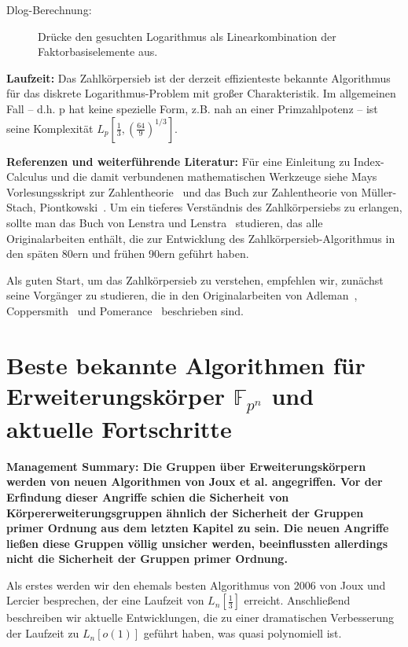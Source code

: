 \begin{refsegment}
\begin{description}
\item[Dlog-Berechnung:] Drücke den gesuchten Logarithmus als Linearkombination der Faktorbasiselemente aus.
\end{description}

\noindent \textbf{Laufzeit:}
Das Zahlkörpersieb ist der derzeit effizienteste bekannte Algorithmus für das diskrete Logarithmus-Problem mit großer Charakteristik. Im allgemeinen Fall -- d.h. p hat keine spezielle Form, z.B. nah an einer Primzahlpotenz -- ist seine Komplexität $L_p[\frac 1
3,\left(\frac{64}{9}\right)^{1/3}]$.

\noindent \textbf{Referenzen und weiterführende Literatur:}
Für eine Einleitung zu Index-Calculus und die damit verbundenen mathematischen Werkzeuge siehe Mays Vorlesungsskript zur Zahlentheorie~\cite{May2013} und das Buch zur Zahlentheorie von M\"uller-Stach, Piontkowski~\cite{MSP2011}. Um ein tieferes Verständnis des Zahlkörpersiebs zu erlangen, sollte man das Buch von Lenstra und Lenstra~\cite{NFS1993} studieren, das alle Originalarbeiten enthält, die zur Entwicklung des Zahlkörpersieb-Algorithmus in den späten 80ern und frühen 90ern geführt haben.

Als guten Start, um das Zahlkörpersieb zu verstehen, empfehlen wir, zunächst seine Vorgänger zu studieren, die in den Originalarbeiten von Adleman~\cite{Adleman1979}, Coppersmith~\cite{CoppersmithOS1986} und Pomerance~\cite{Pomerance1984,Pomerance1996} beschrieben sind.


\newpage
\section{\texorpdfstring{Beste bekannte Algorithmen für Erweiterungskörper $\mathbb{F}_{p^n}$ und aktuelle Fortschritte}
                        {Beste bekannte Algorithmen für Erweiterungskörper Fpn und aktuelle Fortschritte}}
\label{ffs}
\textbf{Management Summary: Die Gruppen über Erweiterungskörpern werden von neuen Algorithmen von Joux et al. angegriffen. Vor der Erfindung dieser Angriffe schien die Sicherheit von Körpererweiterungsgruppen ähnlich der Sicherheit der Gruppen primer Ordnung aus dem letzten Kapitel zu sein. Die neuen Angriffe ließen diese Gruppen völlig unsicher werden, beeinflussten allerdings nicht die Sicherheit der Gruppen primer Ordnung.\\[0.1cm]}

Als erstes werden wir den ehemals besten Algorithmus von 2006 von Joux und Lercier besprechen, der eine Laufzeit von $L_n[\frac 1 3]$ erreicht. Anschließend beschreiben wir aktuelle Entwicklungen, die zu einer dramatischen Verbesserung der Laufzeit zu $L_n[o(1)]$ geführt haben, was quasi polynomiell ist.



\end{refsegment}

